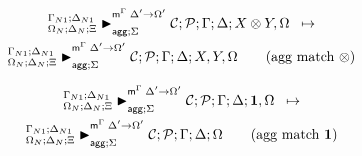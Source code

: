 
\begin{multline}
\transx{
   \matstatea{\Delta_N}{\lstack{C};
      \lstack{P}}{\Gamma}{\Delta}{X \otimes Y, \Omega}{\Delta' \rightarrow
         \Omega'}{\Sigma}
}
{
   \matstatea{\Delta_N}{\lstack{C};
      \lstack{P}}{\Gamma}{\Delta}{X, Y, \Omega}{\Delta' \rightarrow
         \Omega'}{\Sigma}
} \tag{agg match $\otimes$}
\end{multline}

\begin{multline}
\transx{
   \matstatea{\Delta_N}{\lstack{C};
      \lstack{P}}{\Gamma}{\Delta}{\one, \Omega}{\Delta' \rightarrow
         \Omega'}{\Sigma}
}
{
   \matstatea{\Delta_N}{\lstack{C};
      \lstack{P}}{\Gamma}{\Delta}{\Omega}{\Delta' \rightarrow
         \Omega'}{\Sigma}
      } \tag{agg match $\one$}
\end{multline}
